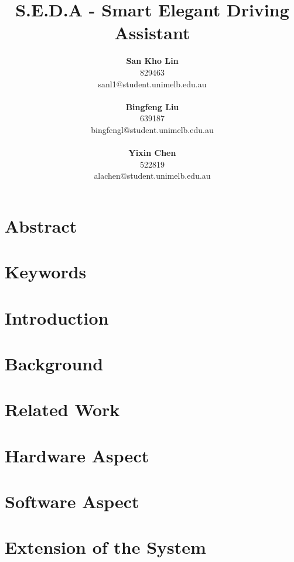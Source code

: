 \documentclass{chi-ext}
\title{S.E.D.A - Smart Elegant Driving Assistant}
\author{
  \textbf{San Kho Lin} \\
  829463 \\
  sanl1@student.unimelb.edu.au \\
  \\
  \textbf{Bingfeng Liu} \\
  639187 \\
  bingfengl@student.unimelb.edu.au \\
  \\
  \textbf{Yixin Chen} \\
  522819 \\
  alachen@student.unimelb.edu.au \\
}
\begin{document}
\maketitle

\begin{multicols}{2}
  
\makeauthors
\makecopyright

\section{Abstract}


\section{Keywords}
\makeatletter \@keywords \makeatother



\section{Introduction}


\section{Background}


\section{Related Work}


\section{Hardware Aspect}


\section{Software Aspect}


\section{Extension of the System}



\end{multicols}
\end{document}

